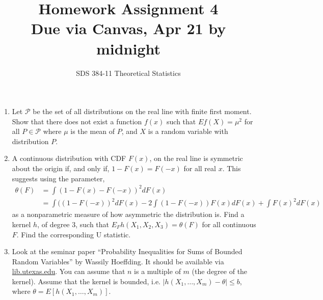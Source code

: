 \documentclass[11pt]{article}
\begin{document}
\title{{\bf Homework Assignment 4}\\Due via Canvas, Apr 21 by midnight}
\author{SDS 384-11 Theoretical Statistics}

\date{}

\maketitle{}
\begin{enumerate}%

\item Let $\mathcal{P}$ be the set of all distributions on the real line with finite first moment. Show
that there does not exist a function $f(x)$ such that $Ef(X) = \mu^2$ for all $P\in \mathcal{P}$ where $\mu$
is the mean of $P$, and $X$ is a random variable with distribution $P$.


\item A continuous distribution with CDF $F(x)$, on the real line is symmetric about the origin if,
and only if, $1 - F(x) = F(-x)$ for all real $x$. This suggests using the parameter,
\begin{align}
\theta(F)&=\int(1-F(x)-F(-x))^2dF(x)\\
&=\int((1-F(-x))^2dF(x)-2\int(1-F(-x))F(x)dF(x)+\int F(x)^2dF(x)
\end{align}
as a nonparametric measure of how asymmetric the distribution is. Find a kernel $h$, of degree
$3$, such that $E_F h(X_1, X_2, X_3) = \theta(F)$ for all continuous $F$. Find the corresponding U statistic.

\item Look at the seminar paper ``Probability Inequalities for Sums of Bounded Random Variables'' by Wassily Hoeffding. It should be available via \url{lib.utexas.edu}. You can assume that $n$ is a multiple of $m$ (the degree of the kernel). Assume that the kernel is bounded, i.e. $|h(X_1,\dots,X_m)-\theta|\leq b$, where $\theta=E[h(X_1,\dots, X_m)]$.


\end{enumerate}
\end{document}
